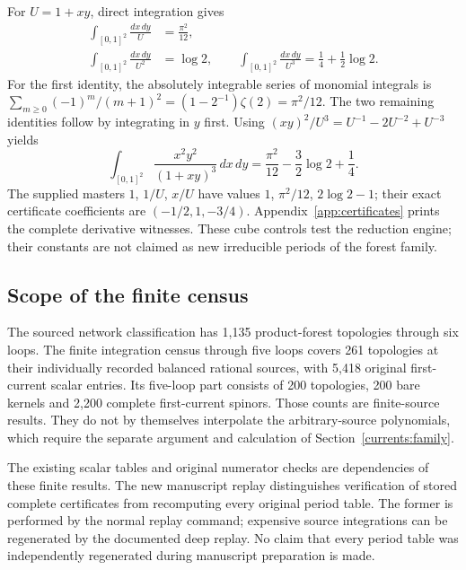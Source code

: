 For $U=1+xy$, direct integration gives
\begin{align}
 \int_{[0,1]^2}\frac{dx\,dy}{U}&=\frac{\pi^2}{12},\nonumber\\
 \int_{[0,1]^2}\frac{dx\,dy}{U^2}&=\log2,\qquad
 \int_{[0,1]^2}\frac{dx\,dy}{U^3}
 =\frac14+\frac12\log2.\label{implementation:two-base}
\end{align}
For the first identity, the absolutely integrable series of
monomial integrals is
$\sum_{m\ge0}(-1)^m/(m+1)^2=(1-2^{-1})\zeta(2)=\pi^2/12$.
The two remaining identities follow by integrating in $y$ first.
Using $(xy)^2/U^3=U^{-1}-2U^{-2}+U^{-3}$ yields
\begin{equation}
 \int_{[0,1]^2}\frac{x^2y^2}{(1+xy)^3}\,dx\,dy
 =\frac{\pi^2}{12}-\frac32\log2+\frac14.
 \label{implementation:twovar}
\end{equation}
The supplied masters $1$, $1/U$, $x/U$ have values
$1$, $\pi^2/12$, $2\log2-1$; their exact certificate
coefficients are $(-1/2,1,-3/4)$. Appendix~\ref{app:certificates}
prints the complete derivative witnesses. These cube controls
test the reduction engine; their constants are not claimed as
new irreducible periods of the forest family.

\subsection{Scope of the finite census}

The sourced network classification has 1,135 product-forest
topologies through six loops. The finite integration census through
five loops covers 261 topologies at their individually recorded
balanced rational sources, with 5,418 original first-current scalar
entries. Its five-loop part consists of 200 topologies, 200 bare
kernels and 2,200 complete first-current spinors. Those counts are
finite-source results. They do not by themselves interpolate the
arbitrary-source polynomials, which require the separate argument
and calculation of Section~\ref{currents:family}.

The existing scalar tables and original numerator checks are
dependencies of these finite results. The new manuscript replay
distinguishes verification of stored complete certificates from
recomputing every original period table. The former is performed
by the normal replay command; expensive source integrations can
be regenerated by the documented deep replay. No claim that every
period table was independently regenerated during manuscript
preparation is made.

